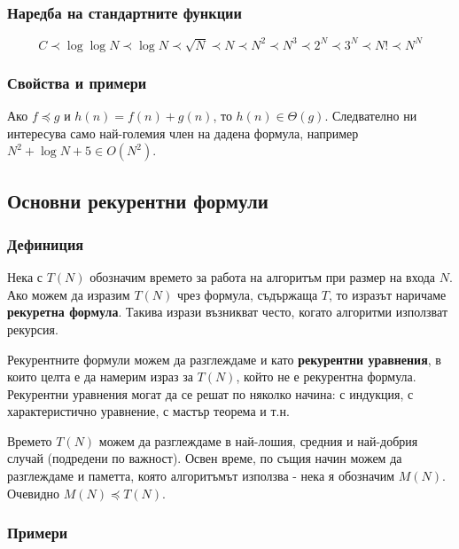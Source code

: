 \documentclass[fleqn,12pt]{article}
\begin{document}
\subsubsection{Наредба на стандартните функции}
\noindent\[ C \prec \log \log N \prec \log N \prec \sqrt{N} \prec N \prec N^2 \prec N^3 \prec 2^N \prec 3^N \prec N! \prec N^N \]

\subsubsection{Свойства и примери}
Ако $f \preceq g$ и $h(n) = f(n) + g(n)$, то $h(n) \in \Theta(g)$.
Следвателно ни интересува само най-големия член на дадена формула, например
$N^2 + \log N + 5 \in O(N^2)$.

\subsection{Основни рекурентни формули}
\subsubsection{Дефиниция}
Нека с $T(N)$ обозначим времето за работа на алгоритъм при размер на входа $N$.
Ако можем да изразим $T(N)$ чрез формула, съдържаща $T$, то изразът наричаме \textbf{рекуретна формула}.
Такива изрази възникват често, когато алгоритми използват рекурсия.

Рекурентните формули можем да разглеждаме и като \textbf{рекурентни уравнения}, в които целта е да намерим израз за $T(N)$,
който не е рекурентна формула. Рекурентни уравнения могат да се решат по няколко начина: с индукция, с характеристично уравнение,
с мастър теорема и т.н.

Времето $T(N)$ можем да разглеждаме в най-лошия, средния и най-добрия случай (подредени по важност).
Освен време, по същия начин можем да разглеждаме и паметта, която алгоритъмът използва - нека я обозначим $M(N)$.
Очевидно $M(N) \preceq T(N)$.

\subsubsection{Примери}
\end{document}
